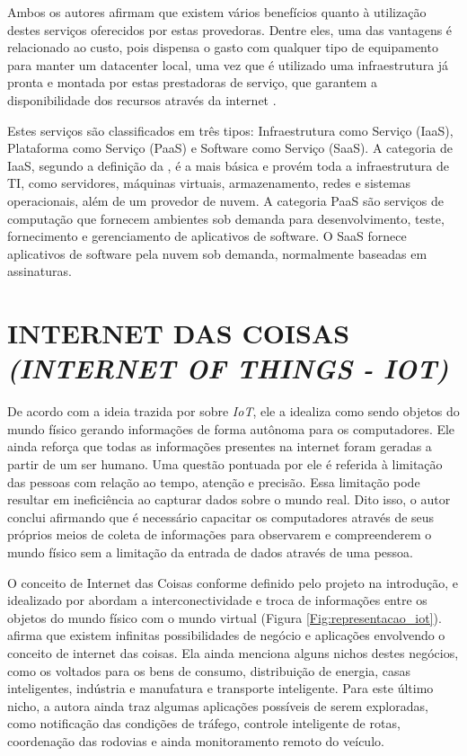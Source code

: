 Ambos os autores afirmam que existem vários benefícios quanto à utilização destes serviços oferecidos por estas provedoras. Dentre eles, uma das vantagens é relacionado ao custo, pois dispensa o gasto com qualquer tipo de equipamento para manter um datacenter local, uma vez que é utilizado uma infraestrutura já pronta e montada por estas prestadoras de serviço, que garantem a disponibilidade dos recursos através da internet \cite{amazoncloudcomputing, microsoft}.

Estes serviços são classificados em três tipos: Infraestrutura como Serviço (IaaS), Plataforma como Serviço (PaaS) e Software como Serviço (SaaS). A categoria de IaaS, segundo a definição da , é a mais básica e provém toda a infraestrutura de TI, como servidores, máquinas virtuais, armazenamento, redes e sistemas operacionais, além de um provedor de nuvem. A categoria PaaS são serviços de computação que fornecem ambientes sob demanda para desenvolvimento, teste, fornecimento e gerenciamento de aplicativos de software. O SaaS fornece aplicativos de software pela nuvem sob demanda, normalmente baseadas em assinaturas.

\section{INTERNET DAS COISAS \textit{(INTERNET OF THINGS - IOT)}}
De acordo com a ideia trazida por  sobre \textit{IoT}, ele a idealiza como sendo objetos do mundo físico gerando informações de forma autônoma para os computadores. Ele ainda reforça que todas as informações presentes na internet foram geradas a partir de um ser humano. Uma questão pontuada por ele é referida à limitação das pessoas com relação ao tempo, atenção e precisão. Essa limitação pode resultar em ineficiência ao capturar dados sobre o mundo real. Dito isso, o autor conclui afirmando que é necessário capacitar os computadores através de seus próprios meios de coleta de informações para observarem e compreenderem o mundo físico sem a limitação da entrada de dados através de uma pessoa.

O conceito de Internet das Coisas conforme definido pelo projeto  na introdução, e idealizado por  abordam a interconectividade e troca de informações entre os objetos do mundo físico com o mundo virtual (Figura \ref{Fig:representacao_iot}).  afirma que existem infinitas possibilidades de negócio e aplicações envolvendo o conceito de internet das coisas. Ela ainda menciona alguns nichos destes negócios, como os voltados para os bens de consumo, distribuição de energia, casas inteligentes, indústria e manufatura e transporte inteligente. Para este último nicho, a autora ainda traz algumas aplicações possíveis de serem exploradas, como notificação das condições de tráfego, controle inteligente de rotas, coordenação das rodovias e ainda monitoramento remoto do veículo.

